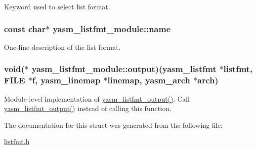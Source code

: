Keyword used to select list format. \hypertarget{structyasm__listfmt__module_a0817d3519e1ac91a1bad94b28a7edadd}{
\subsubsection[{name}]{\setlength{\rightskip}{0pt plus 5cm}const char$\ast$ yasm\-\_\-listfmt\-\_\-module\-::name}}\label{structyasm__listfmt__module_a0817d3519e1ac91a1bad94b28a7edadd}
One-\/line description of the list format. \hypertarget{structyasm__listfmt__module_a5d3da5cb63cf141bc06c8db40e2d4876}{
\subsubsection[{output}]{\setlength{\rightskip}{0pt plus 5cm}void($\ast$ yasm\-\_\-listfmt\-\_\-module\-::output)({\bf yasm\-\_\-listfmt} $\ast$listfmt, F\-I\-L\-E $\ast$f, {\bf yasm\-\_\-linemap} $\ast$linemap, {\bf yasm\-\_\-arch} $\ast$arch)}}\label{structyasm__listfmt__module_a5d3da5cb63cf141bc06c8db40e2d4876}
Module-\/level implementation of \hyperlink{listfmt_8h_a3d74e009674c5b67e5c29d31207630e2}{yasm\-\_\-listfmt\-\_\-output()}. Call \hyperlink{listfmt_8h_a3d74e009674c5b67e5c29d31207630e2}{yasm\-\_\-listfmt\-\_\-output()} instead of calling this function. 

The documentation for this struct was generated from the following file\-:\begin{DoxyCompactItemize}
\item 
\hyperlink{listfmt_8h}{listfmt.\-h}\end{DoxyCompactItemize}
